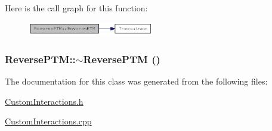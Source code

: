 Here is the call graph for this function:\nopagebreak
\begin{figure}[H]
\begin{center}
\leavevmode
\includegraphics[width=156pt]{classReversePTM_a300458e98e0701ca87cf608eca89b3b3_cgraph}
\end{center}
\end{figure}
\hypertarget{classReversePTM_a338b4f272334ae707b910fcee0f86ffc}{
\subsubsection[{$\sim$ReversePTM}]{\setlength{\rightskip}{0pt plus 5cm}ReversePTM::$\sim$ReversePTM ()}}
\label{classReversePTM_a338b4f272334ae707b910fcee0f86ffc}


The documentation for this class was generated from the following files:\begin{DoxyCompactItemize}
\item 
\hyperlink{CustomInteractions_8h}{CustomInteractions.h}\item 
\hyperlink{CustomInteractions_8cpp}{CustomInteractions.cpp}\end{DoxyCompactItemize}
